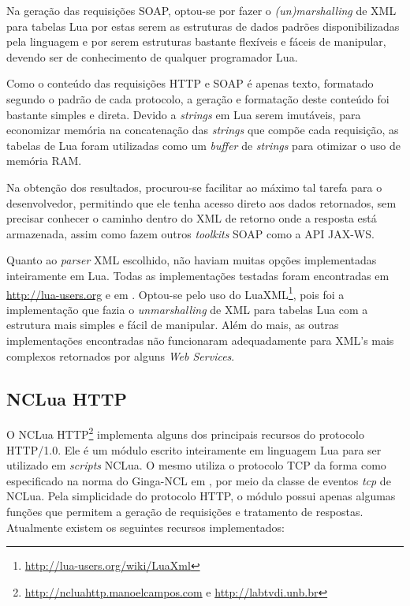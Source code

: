 Na geração das requisições SOAP, optou-se por fazer o \textit{(un)marshalling}
de XML para tabelas Lua por estas serem as estruturas de dados
padrões disponibilizadas pela linguagem e por serem estruturas
bastante flexíveis e fáceis de manipular, devendo ser de conhecimento
de qualquer programador Lua.

Como o conteúdo das requisições HTTP e SOAP é apenas texto, formatado
segundo o padrão de cada protocolo, a geração e formatação
deste conteúdo foi bastante simples e direta. Devido a
\textit{strings} em Lua serem imutáveis\cite{ierusalimschy2006programming},
para economizar memória na concatenação das \textit{strings} que compõe
cada requisição, as tabelas de Lua foram utilizadas
como um \textit{buffer} de \textit{strings} para otimizar o uso de memória RAM.

Na obtenção dos resultados, procurou-se facilitar ao máximo
tal tarefa para o desenvolvedor, permitindo que ele
tenha acesso direto aos dados retornados, sem precisar
conhecer o caminho dentro do XML de retorno onde
a resposta está armazenada, assim como fazem outros \textit{toolkits} SOAP
como a API JAX-WS.

Quanto ao \textit{parser} XML escolhido, não haviam muitas opções
implementadas inteiramente em Lua. 
Todas as implementações testadas foram encontradas
em \url{http://lua-users.org} e em \cite{ierusalimschy2006programming}.
Optou-se pelo uso do LuaXML\footnote{\url{http://lua-users.org/wiki/LuaXml}},
pois foi a implementação que fazia o \textit{unmarshalling} de XML
para tabelas Lua com a estrutura mais simples e fácil de manipular.
Além do mais, as outras implementações encontradas não funcionaram
adequadamente para XML's mais complexos retornados
por alguns \textit{Web Services}.

\subsection{NCLua HTTP} \label{sec:ncluahttp}

O NCLua HTTP\footnote{\url{http://ncluahttp.manoelcampos.com} e \url{http://labtvdi.unb.br}} implementa alguns dos principais recursos do protocolo HTTP/1.0. 
Ele é um módulo escrito inteiramente em linguagem Lua
para ser utilizado em \textit{scripts} NCLua. O mesmo utiliza o protocolo TCP da forma como especificado na norma do Ginga-NCL
em \cite{abnt200815606}, por meio da classe de eventos \textit{tcp} de NCLua.
Pela simplicidade do protocolo HTTP, o módulo possui apenas algumas funções que permitem a geração
de requisições e tratamento de respostas. Atualmente existem os seguintes recursos implementados:


